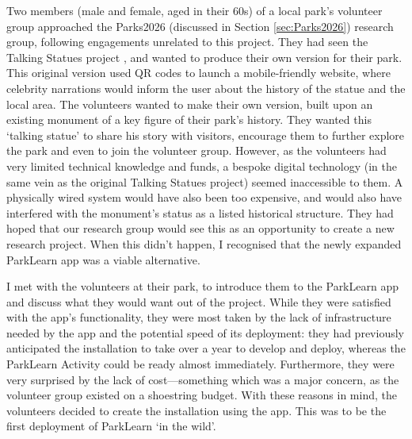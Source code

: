 Two members (male and female, aged in their 60s) of a local park's volunteer group approached the Parks2026 (discussed in Section \ref{sec:Parks2026}) research group, following engagements unrelated to this project. They had seen the Talking Statues project \citep{Sing2017}, and wanted to produce their own version for their park. This original version used QR codes to launch a mobile-friendly website, where celebrity narrations would inform the user about the history of the statue and the local area. The volunteers wanted to make their own version, built upon an existing monument of a key figure of their park's history. They wanted this `talking statue' to share his story with visitors, encourage them to further explore the park and even to join the volunteer group. However, as the volunteers had very limited technical knowledge and funds, a bespoke digital technology (in the same vein as the original Talking Statues project) seemed inaccessible to them. A physically wired system would have also been too expensive, and would also have interfered with the monument’s status as a listed historical structure. They had hoped that our research group would see this as an opportunity to create a new research project. When this didn't happen, I recognised that the newly expanded ParkLearn app was a viable alternative.

I met with the volunteers at their park, to introduce them to the ParkLearn app and discuss what they would want out of the project. While they were satisfied with the app's functionality, they were most taken by the lack of infrastructure needed by the app and the potential speed of its deployment: they had previously anticipated the installation to take over a year to develop and deploy, whereas the ParkLearn Activity could be ready almost immediately. Furthermore, they were very surprised by the lack of cost---something which was a major concern, as the volunteer group existed on a shoestring budget. With these reasons in mind, the volunteers decided to create the installation using the app. This was to be the first deployment of ParkLearn `in the wild'.


